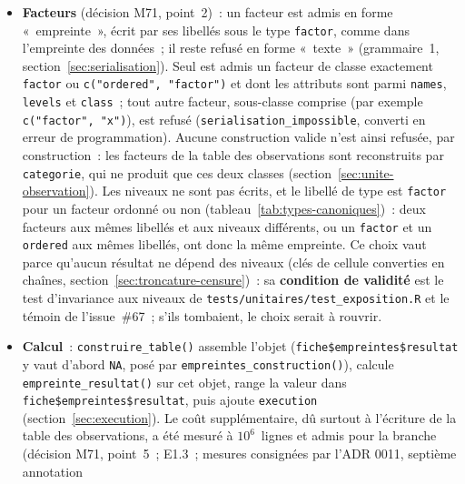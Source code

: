 \documentclass[a4paper,11pt]{article}
\newcommand{\code}[1]{\texttt{\small #1}}
\begin{document}
\begin{itemize}[leftmargin=*, itemsep=2pt]
    démontrée. Il repose sur la normalisation de la table des observations
    par l'étape \code{donnees} (section~\ref{sec:unite-observation},
    «~Copie des colonnes dans la table des observations~»)~; une colonne
    recopiée sans normalisation le contredirait, comme l'a montré la
    régression des noms de lignes corrigée par l'issue~\#67, survenue alors
    que cette normalisation existait déjà.
  \item \textbf{Facteurs} (décision M71, point~2)~: un facteur est admis en
    forme «~empreinte~», écrit par ses libellés sous le type \code{factor},
    comme dans l'empreinte des données~; il reste refusé en forme «~texte~»
    (grammaire~1, section~\ref{sec:serialisation}). Seul est admis un
    facteur de classe exactement \code{factor} ou \code{c("ordered", "factor")}
    et dont les attributs sont parmi \code{names}, \code{levels} et
    \code{class}~; tout autre facteur, sous-classe comprise (par exemple
    \code{c("factor", "x")}), est refusé
    (\code{serialisation\_impossible}, converti en erreur de programmation).
    Aucune construction valide n'est ainsi refusée, par construction~: les
    facteurs de la table des observations sont reconstruits par
    \code{categorie}, qui ne produit que ces deux classes (section~\ref{sec:unite-observation}).
    Les niveaux ne sont pas écrits, et le libellé de type est \code{factor}
    pour un facteur ordonné ou non (tableau~\ref{tab:types-canoniques})~:
    deux facteurs aux mêmes libellés et aux niveaux différents, ou un
    \code{factor} et un \code{ordered} aux mêmes libellés, ont donc la même
    empreinte. Ce
    choix vaut parce qu'aucun résultat ne dépend des niveaux (clés de
    cellule converties en chaînes, section~\ref{sec:troncature-censure})~:
    sa \textbf{condition de validité} est le test d'invariance aux niveaux de
    \code{tests/unitaires/test\_exposition.R} et le témoin de l'issue~\#67~;
    s'ils tombaient, le choix serait à rouvrir.
  \item \textbf{Calcul}~: \code{construire\_table()} assemble l'objet
    (\code{fiche\$empreintes\$resultat} y vaut d'abord \code{NA}, posé par
    \code{empreintes\_construction()}), calcule \code{empreinte\_resultat()}
    sur cet objet, range la valeur dans \code{fiche\$empreintes\$resultat},
    puis ajoute \code{execution} (section~\ref{sec:execution}). Le coût
    supplémentaire, dû surtout à l'écriture de la table des observations, a
    été mesuré à $10^6$~lignes et admis pour la branche (décision M71,
    point~5~; E1.3~; mesures consignées par l'ADR 0011, septième annotation

\end{itemize}
\end{document}
